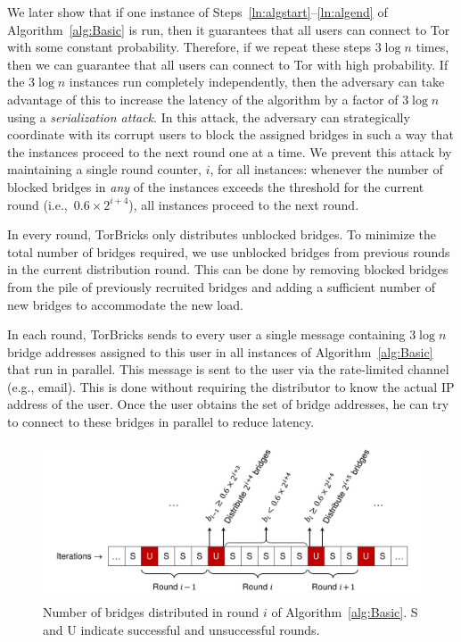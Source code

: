 \documentclass{sig-alternate-05-2015}
\newcommand{\fullpaper}[1]{#1}
\newcommand{\fullpaper}[1]{}
\newcommand{\ie}{i.e.}
\newcommand{\bricks}{}
\def\bricks/{\mbox{TorBricks}}
\begin{document}
We later show that if one instance of Steps~\ref{ln:algstart}--\ref{ln:algend} of Algorithm~\ref{alg:Basic} is run, then it guarantees that all users can connect to Tor with some constant probability. Therefore, if we repeat these steps ${3\log{n}}$ times, then we can guarantee that all users can connect to Tor with high probability.
If the $3\log{n}$ instances run completely independently, then the adversary can take advantage of this to increase the latency of the algorithm by a factor of $3\log{n}$ using a \emph{serialization attack}. In this attack, the adversary can strategically coordinate with its corrupt users to block the assigned bridges in such a way that the instances proceed to the next round one at a time. 
We prevent this attack by maintaining a single round counter, $i$, for all instances: whenever the number of blocked bridges in \emph{any} of the instances exceeds the threshold for the current round (\ie,~${0.6 \times 2^{i+4}}$), all instances proceed to the next round.

In every round, \bricks/ only distributes unblocked bridges. To minimize the total number of bridges required, we use unblocked bridges from previous rounds in the current distribution round. This can be done by removing blocked bridges from the pile of previously recruited bridges and adding a sufficient number of new bridges to accommodate the new load.

In each round, \bricks/ sends to every user a single message containing $3\log{n}$ bridge addresses assigned to this user in all  instances of Algorithm~\ref{alg:Basic} that run in parallel. This message is sent to the user via the rate-limited channel (e.g., email). \fullpaper{This is done without requiring the distributor to know the actual IP address of the user. Once the user obtains the set of bridge addresses, he can try to connect to these bridges in parallel to reduce latency.}

\begin{figure}
	\centering
	\includegraphics[width=0.75\linewidth]{images/rounds}
	\caption{Number of bridges distributed in round $i$ of Algorithm~\ref{alg:Basic}. S and U indicate successful and unsuccessful rounds.}
	\label{fig:rounds}
\end{figure}
\end{document}
